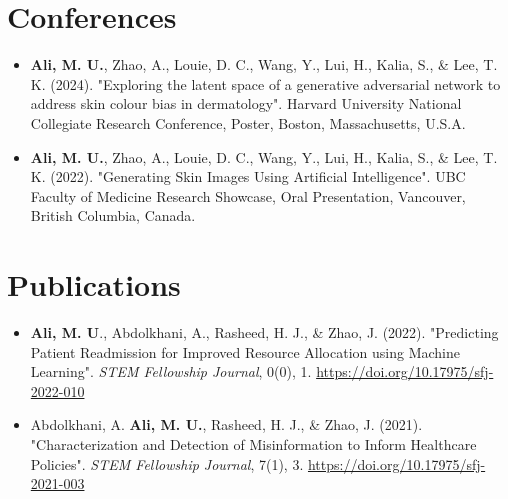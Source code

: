 
\section{Conferences}

\begin{itemize}[leftmargin=0.15in, label={}]
    \item{\textbf{Ali, M. U.}, Zhao, A., Louie, D. C., Wang, Y., Lui, H., Kalia, S., \& Lee, T. K. (2024). "Exploring the latent space of a generative adversarial network to address skin colour bias in dermatology". Harvard University National Collegiate Research Conference, Poster, Boston, Massachusetts, U.S.A.}
    \item{\textbf{Ali, M. U.}, Zhao, A., Louie, D. C., Wang, Y., Lui, H., Kalia, S., \& Lee, T. K. (2022). "Generating Skin Images Using Artificial Intelligence". UBC Faculty of Medicine Research Showcase, Oral Presentation, Vancouver, British Columbia, Canada.}
\end{itemize}

\section{Publications}

\begin{itemize}[leftmargin=0.15in, label={}]
    \item{\textbf{Ali, M. U}., Abdolkhani, A., Rasheed, H. J., \& Zhao, J. (2022). "Predicting Patient Readmission for Improved Resource Allocation using Machine Learning". \textit{STEM Fellowship Journal}, 0(0), 1. \url{https://doi.org/10.17975/sfj-2022-010}}
    \item{Abdolkhani, A. \textbf{Ali, M. U.}, Rasheed, H. J., \& Zhao, J. (2021). "Characterization and Detection of Misinformation to Inform Healthcare Policies". \textit{STEM Fellowship Journal}, 7(1), 3. \url{https://doi.org/10.17975/sfj-2021-003}}
\end{itemize}




